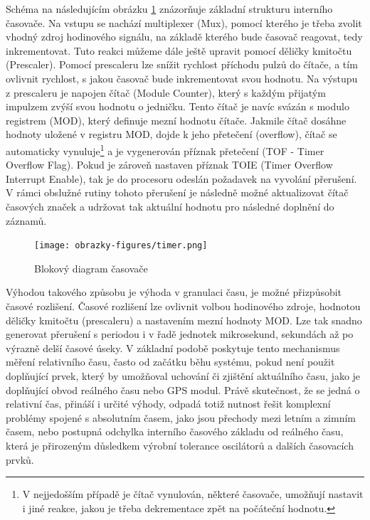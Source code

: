 Schéma na následujícím obrázku \ref{fig:timer} znázorňuje základní strukturu interního časovače. Na vstupu se nachází multiplexer (Mux), pomocí kterého je třeba zvolit vhodný zdroj hodinového signálu, na základě kterého bude časovač reagovat, tedy inkrementovat. Tuto reakci můžeme dále ještě upravit pomocí děličky kmitočtu (Prescaler). Pomocí prescaleru lze snížit rychlost příchodu pulzů do čítače, a tím ovlivnit rychlost, s jakou časovač bude inkrementovat svou hodnotu. Na výstupu z prescaleru je napojen čítač (Module Counter), který s každým přijatým impulzem zvýší svou hodnotu o jedničku. Tento čítač je navíc svázán s modulo registrem (MOD), který definuje mezní hodnotu čítače. Jakmile čítač dosáhne hodnoty uložené v registru MOD, dojde k jeho přetečení (overflow), čítač se automaticky vynuluje\footnote{V nejjedošším případě je čítač vynulován, některé časovače, umožňují nastavit i jiné reakce, jakou je třeba dekrementace zpět na počáteční hodnotu.} a je vygenerován příznak přetečení (TOF - Timer Overflow Flag). Pokud je zároveň nastaven příznak TOIE (Timer Overflow Interrupt Enable), tak je do procesoru odeslán požadavek na vyvolání přerušení. V rámci obslužné rutiny tohoto přerušení je následně možné aktualizovat čítač časových značek a udržovat tak aktuální hodnotu pro následné doplnění do záznamů. 

\begin{figure}[h]
    \centering
    \texttt{[image: obrazky-figures/timer.png]}
    
    \caption{Blokový diagram časovače}
    \label{fig:timer}
\end{figure}

Výhodou takového způsobu je výhoda v granulaci času, je možné přizpůsobit časové rozlišení. Časové rozlišení lze ovlivnit volbou hodinového zdroje, hodnotou děličky kmitočtu (prescaleru) a nastavením mezní hodnoty MOD. Lze tak snadno generovat přerušení s periodou i v řadě jednotek mikrosekund, sekundách až po výrazně delší časové úseky. V základní podobě poskytuje tento mechanismus měření relativního času, často od začátku běhu systému, pokud není použit doplňující prvek, který by umožňoval uchování či zjištění aktuálního času, jako je doplňující obvod reálného času nebo GPS modul. Právě skutečnost, že se jedná o relativní čas, přináší i určité výhody, odpadá totiž nutnost řešit komplexní problémy spojené s absolutním časem, jako jsou přechody mezi letním a zimním časem, nebo postupná odchylka interního časového základu od reálného času, která je přirozeným důsledkem výrobní tolerance oscilátorů a dalších časovacích prvků.

